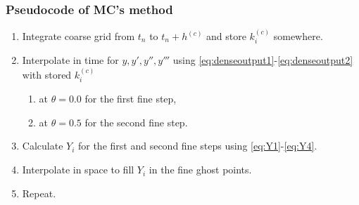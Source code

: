 \documentclass[prd,aps,a4paper,superscriptaddress,onecolumn,footinbib]{revtex4}
\begin{document}
\subsubsection{Pseudocode of MC's method}
\begin{enumerate}
    \item Integrate coarse grid from $t_n$ to $t_n+h^{(c)}$ and store $k^{(c)}_i$
        somewhere.
    \item Interpolate in time for $y,y',y'',y'''$ using
        \eqref{eq:denseoutput1}-\eqref{eq:denseoutput2} with stored $k_i^{(c)}$
        \begin{enumerate}[label=(\alph*)]
            \item at $\theta=0.0$ for the first fine step,
            \item at $\theta=0.5$ for the second fine step.
        \end{enumerate}
    \item Calculate $Y_i$ for the first and second fine steps using \eqref{eq:Y1}-\eqref{eq:Y4}.
    \item Interpolate in space to fill $Y_i$ in the fine ghost points.
    \item Repeat.
\end{enumerate}





\end{document}

